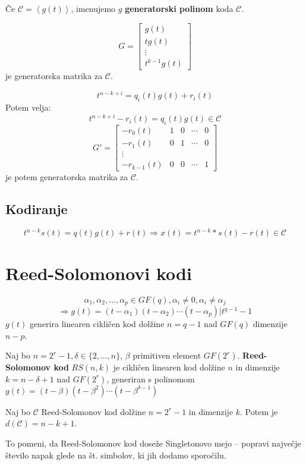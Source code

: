 \begin{multicols}{5}
Če $\mathcal{C}=\left<g(t)\right>$, imenujemo $g$ \textbf{generatorski polinom} koda $\mathcal{C}$.

\[G=\begin{bmatrix}g(t) \\ tg(t) \\ \vdots \\ t^{k-1} g(t)\end{bmatrix}\]
je generatorska matrika za $\mathcal{C}$.

\[t^{n-k+i} = q_i(t)g(t)+r_i(t)\]
Potem velja:
\[t^{n-k+i}-r_i(t) = q_i(t)g(t)\in \mathcal{C}\]
\[G\prime=\begin{bmatrix}-r_0(t) & 1 & 0 & \cdots &0\\ -r_1(t) & 0&1&\cdots &0\\ \vdots \\
-r_{k-1}(t)&0&0&\cdots&1\end{bmatrix}\] je potem generatorska matrika za $\mathcal{C}$.
\subsection{Kodiranje}
\[t^{n-k}s(t) = q(t)g(t)+r(t)\Rightarrow x(t) = t^{n-k}*s(t)-r(t)\in \mathcal{C}\]
\section{Reed-Solomonovi kodi}
\[\alpha_1,\alpha_2,\ldots,\alpha_p\in GF(q), \alpha_i\neq 0, \alpha_i\neq\alpha_j\]
\[\Rightarrow g(t)=(t-\alpha_1)(t-\alpha_2)\cdots(t-\alpha_p)|t^{q-1}-1\]
$g(t)$ generira linearen cikličen kod dolžine $n=q-1$ nad $GF(q)$ dimenzije $n-p$.

Naj bo $n=2^r-1, \delta\in\{2,\ldots,n\}$, $\beta$ primitiven element $GF(2^r)$. \textbf{Reed-Solomonov kod}
$RS(n,k)$ je cikličen linearen kod dolžine $n$ in dimenzije $k=n-\delta+1$ nad $GF(2^r)$,
generiran s polinomom $g(t) = (t-\beta)(t-\beta^2)\cdots(t-\beta^{\delta-1})$

Naj bo $\mathcal{C}$ Reed-Solomonov kod dolžine $n=2^r-1$ in dimenzije $k$.
Potem je $d(\mathcal{C})=n-k+1$.

To pomeni, da Reed-Solomonov kod doseže Singletonovo mejo -- popravi največje število napak
glede na št. simbolov, ki jih dodamo sporočilu.
\end{multicols}

